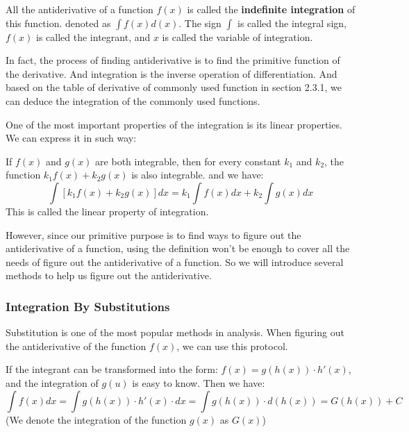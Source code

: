 \begin{definition}
All the antiderivative of a function $f(x)$ is called the \textbf{indefinite integration} of this function. denoted as $\int f(x)d(x)$. The sign $\int$ is called the integral sign, $f(x)$ is called the integrant, and $x$ is called the variable of integration.
\end{definition}

In fact, the process of finding antiderivative is to find the primitive function of the derivative. And integration is the inverse operation of differentiation. And based on the table of derivative of commonly used function in section 2.3.1, we can deduce the integration of the commonly used functions.

One of the most important properties of the integration is its linear properties. We can express it in such way:

\begin{theorem}
If $f(x)$ and $g(x)$ are both integrable, then for every constant $k_1$ and $k_2$, the function $k_1f(x)+k_2g(x)$ is also integrable. and we have:
\[
\int[k_1f(x)+k_2g(x)]dx = k_1\int f(x) dx+k_2\int g(x)dx
\]
This is called the linear property of integration.
\end{theorem}

However, since our primitive purpose is to find ways to figure out the antiderivative of a function, using the definition won't be enough to cover all the needs of figure out the antiderivative of a function. So we will introduce several methods to help us figure out the antiderivative.

\subsubsection{Integration By Substitutions}
Substitution is one of the most popular methods in analysis. When figuring out the antiderivative of the function $f(x)$, we can use this protocol.

\begin{definition}
If the integrant can be transformed into the form: $f(x) = g(h(x))\cdot h'(x)$, and the integration of $g(u)$ is easy to know. Then we have:
\[
\int f(x)dx = \int g(h(x))\cdot h'(x)\cdot dx = \int g(h(x)) \cdot d(h(x)) = G(h(x)) +C
\]
(We denote the integration of the function $g(x)$ as $G(x)$)
\end{definition}


